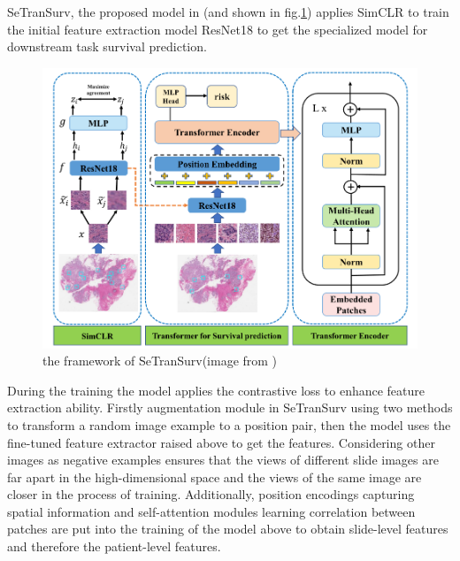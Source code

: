 \documentclass[journal,twoside,web]{ieeecolor}
\begin{document}
SeTranSurv, the proposed model in \cite{huang2021integration}(and shown in fig.\ref{SeTranSurv}) applies SimCLR to train the initial feature extraction model ResNet18\cite{he2016deep} to get the specialized model for downstream task survival prediction.
\begin{figure}
    \centering
    \includegraphics[width=0.8\linewidth]{img/setran.png}
    \caption{the framework of SeTranSurv(image from \cite{huang2021integration})}
    \label{SeTranSurv}
\end{figure}
During the training the model applies the contrastive loss\cite{he2020momentum} to enhance feature extraction ability.
Firstly augmentation module in SeTranSurv using two methods to transform a random image example to a position pair, then the model uses the fine-tuned feature extractor raised above to get the features. 
Considering other images as negative examples ensures that the views of different slide images are far apart in the high-dimensional space and the views of the same image are closer in the process of training.
Additionally, position encodings capturing spatial information and self-attention modules learning correlation between patches are put into the training of the model above to obtain slide-level features and therefore the patient-level features.
\end{document}
